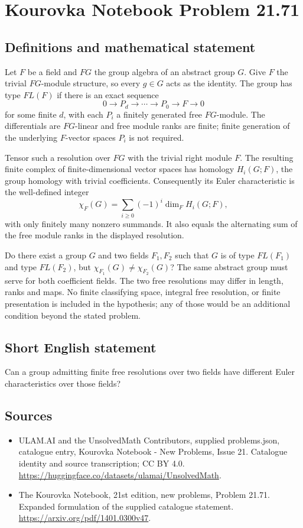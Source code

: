 \documentclass[11pt,a4paper]{article}
\begin{document}
\section*{Kourovka Notebook Problem 21.71}\label{statement}

\subsection{Definitions and mathematical statement}
Let $F$ be a field and $FG$ the group algebra of an abstract group
$G$. Give $F$ the trivial $FG$-module structure, so every $g\in G$
acts as the identity. The group has type $FL(F)$ if there is an exact
sequence
\[
 0\longrightarrow P_d\longrightarrow\cdots\longrightarrow P_0
 \longrightarrow F\longrightarrow0
\]
for some finite $d$, with each $P_i$ a finitely generated free
$FG$-module. The differentials are $FG$-linear and free module ranks
are finite; finite generation of the underlying $F$-vector spaces
$P_i$ is not required.

Tensor such a resolution over $FG$ with the trivial right module $F$.
The resulting finite complex of finite-dimensional vector spaces has
homology $H_i(G;F)$, the group homology with trivial coefficients.
Consequently its Euler characteristic is the well-defined integer
\[
 \chi_F(G)=\sum_{i\ge0}(-1)^i\dim_F H_i(G;F),
\]
with only finitely many nonzero summands. It also equals the alternating
sum of the free module ranks in the displayed resolution.

Do there exist a group $G$ and two fields $F_1,F_2$ such that $G$ is
of type $FL(F_1)$ and type $FL(F_2)$, but
$\chi_{F_1}(G)\ne\chi_{F_2}(G)$?
The same abstract group must serve for both coefficient fields.
The two free resolutions may differ in length, ranks and maps.
No finite classifying space, integral free resolution, or finite
presentation is included in the hypothesis; any of those would be
an additional condition beyond the stated problem.
\subsection{Short English statement}
Can a group admitting finite free resolutions over two fields have different Euler characteristics over those fields?
\subsection{Sources}
\begin{itemize}
\item[S1] ULAM.AI and the UnsolvedMath Contributors, supplied problems.json, catalogue entry, Kourovka Notebook - New Problems, Issue 21. Catalogue identity and source transcription; CC BY 4.0.
\url{https://huggingface.co/datasets/ulamai/UnsolvedMath}.
\item[S2] The Kourovka Notebook, 21st edition, new problems, Problem 21.71. Expanded formulation of the supplied catalogue statement.
\url{https://arxiv.org/pdf/1401.0300v47}.
\end{itemize}
\end{document}
